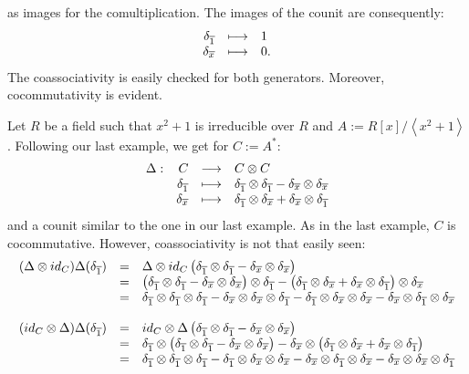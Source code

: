 as images for the comultiplication. The images of the counit are consequently:
$$\bao{rcl}
\delta_{\ov{1}} &\longmapsto& 1\\
\delta_{\ov{x}} &\longmapsto& 0.\\
\ea$$
The coassociativity is easily checked for both generators. Moreover, cocommutativity is evident.
\item \label{coalg02} Let $R$ be a field such that $x^2 + 1$ is irreducible over $R$ and $A := R[x]/\left<x^2 + 1\right>$. Following our last example, we get for $C := A^*$:
$$\bao{rrcl}
\Delta:& C &\longrightarrow& C \otimes C\\
& \delta_{\ov{1}} &\longmapsto & \delta_{\ov{1}} \otimes \delta_{\ov{1}} - \delta_{\ov{x}} \otimes \delta_{\ov{x}}\\
& \delta_{\ov{x}} &\longmapsto & \delta_{\ov{1}} \otimes \delta_{\ov{x}} + \delta_{\ov{x}} \otimes \delta_{\ov{1}}\\
\ea$$
and a counit similar to the one in our last example. As in the last example, $C$ is cocommutative. However, coassociativity is not that easily seen:
$$\bao{rcl}
(\Delta \otimes id_C)\Delta(\delta_{\ov{1}}) &=& \Delta \otimes id_C\left(\delta_{\ov{1}} \otimes \delta_{\ov{1}} - \delta_{\ov{x}} \otimes \delta_{\ov{x}}\right)\\
&=& \left(\delta_{\ov{1}} \otimes \delta_{\ov{1}} - \delta_{\ov{x}} \otimes \delta_{\ov{x}}\right) \otimes \delta_{\ov{1}} - \left(\delta_{\ov{1}} \otimes \delta_{\ov{x}} + \delta_{\ov{x}} \otimes \delta_{\ov{1}}\right) \otimes \delta_{\ov{x}}\\
&=& \delta_{\ov{1}} \otimes \delta_{\ov{1}} \otimes \delta_{\ov{1}} - \delta_{\ov{x}} \otimes \delta_{\ov{x}}
\otimes \delta_{\ov{1}} - \delta_{\ov{1}} \otimes \delta_{\ov{x}} \otimes \delta_{\ov{x}} - \delta_{\ov{x}} \otimes \delta_{\ov{1}} \otimes \delta_{\ov{x}}\\
&&\\
(id_C \otimes \Delta)\Delta(\delta_{\ov{1}}) &=& id_C \otimes \Delta\left(\delta_{\ov{1}} \otimes \delta_{\ov{1}} - \delta_{\ov{x}} \otimes \delta_{\ov{x}}\right)\\
&=& \delta_{\ov{1}} \otimes \left(\delta_{\ov{1}} \otimes \delta_{\ov{1}} - \delta_{\ov{x}} \otimes \delta_{\ov{x}}\right) - \delta_{\ov{x}} \otimes \left(\delta_{\ov{1}} \otimes \delta_{\ov{x}} + \delta_{\ov{x}} \otimes \delta_{\ov{1}}\right)\\
&=& \delta_{\ov{1}} \otimes \delta_{\ov{1}} \otimes \delta_{\ov{1}} - \delta_{\ov{1}} \otimes \delta_{\ov{x}} \otimes \delta_{\ov{x}} - \delta_{\ov{x}} \otimes \delta_{\ov{1}} \otimes \delta_{\ov{x}} - \delta_{\ov{x}} \otimes \delta_{\ov{x}}
\otimes \delta_{\ov{1}}\\
\ea$$

